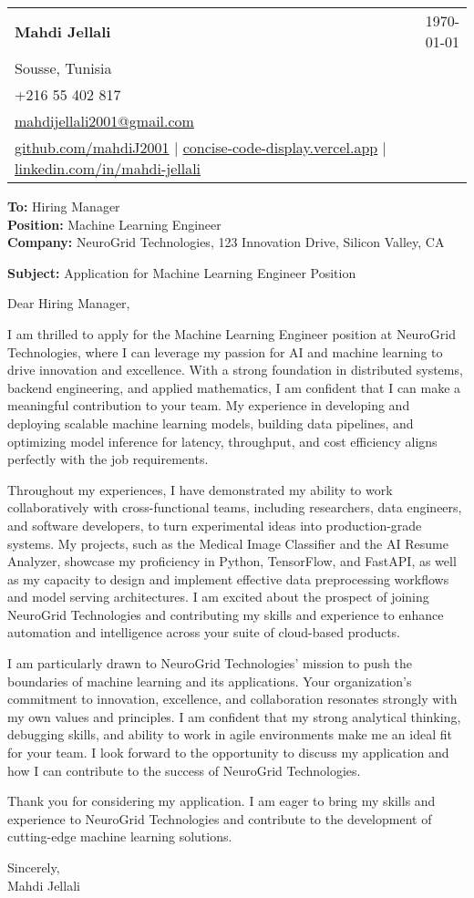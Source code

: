 \documentclass[letterpaper,11pt]{article}
\makeatletter
\newcommand{\letterHeading}[5]{
    \begin{tabular*}{\textwidth}{l@{\extracolsep{\fill}}r}
    \textbf{\Large #1} & #5 \\  %
    #2 & \\
    #3 & \\
    #4 & \\
    \end{tabular*}
    \vspace{15pt}
}
\newcommand{\letterRecipient}[3]{
    \textbf{\large To:} #1 \\
    \textbf{\large Position:} #2 \\
    \textbf{\large Company:} #3 \\
    \vspace{12pt}
}
\newcommand{\letterSubject}[1]{
    \textbf{\large Subject:} #1 \\
    \vspace{15pt}
}
\makeatother
\begin{document}
    \letterHeading
    {Mahdi Jellali}
    {Sousse, Tunisia}
    {+216 55 402 817 \\ \href{mailto:mahdijellali2001@gmail.com}{mahdijellali2001@gmail.com}}
    {\href{https://github.com/mahdiJ2001}{github.com/mahdiJ2001} $|$ \href{https://concise-code-display.vercel.app/}{concise-code-display.vercel.app} $|$ \href{https://www.linkedin.com/in/mahdi-jellali/}{linkedin.com/in/mahdi-jellali}}
    {\today}

    \letterRecipient
    {Hiring Manager}
    {Machine Learning Engineer}
    {NeuroGrid Technologies, 123 Innovation Drive, Silicon Valley, CA}

    \letterSubject{Application for Machine Learning Engineer Position}

    Dear Hiring Manager,

    I am thrilled to apply for the Machine Learning Engineer position at NeuroGrid Technologies, where I can leverage my passion for AI and machine learning to drive innovation and excellence. With a strong foundation in distributed systems, backend engineering, and applied mathematics, I am confident that I can make a meaningful contribution to your team. My experience in developing and deploying scalable machine learning models, building data pipelines, and optimizing model inference for latency, throughput, and cost efficiency aligns perfectly with the job requirements.

    Throughout my experiences, I have demonstrated my ability to work collaboratively with cross-functional teams, including researchers, data engineers, and software developers, to turn experimental ideas into production-grade systems. My projects, such as the Medical Image Classifier and the AI Resume Analyzer, showcase my proficiency in Python, TensorFlow, and FastAPI, as well as my capacity to design and implement effective data preprocessing workflows and model serving architectures. I am excited about the prospect of joining NeuroGrid Technologies and contributing my skills and experience to enhance automation and intelligence across your suite of cloud-based products.

    I am particularly drawn to NeuroGrid Technologies' mission to push the boundaries of machine learning and its applications. Your organization's commitment to innovation, excellence, and collaboration resonates strongly with my own values and principles. I am confident that my strong analytical thinking, debugging skills, and ability to work in agile environments make me an ideal fit for your team. I look forward to the opportunity to discuss my application and how I can contribute to the success of NeuroGrid Technologies.

    Thank you for considering my application. I am eager to bring my skills and experience to NeuroGrid Technologies and contribute to the development of cutting-edge machine learning solutions.

    Sincerely,\\[12pt]

    Mahdi Jellali
\end{document}
